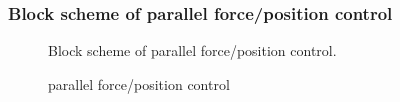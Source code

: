\documentclass{article}
\begin{document}
\subsubsection{Block scheme of parallel force/position control}
\begin{figure}[H]
    \centering
    \caption{Block scheme of parallel force/position control.}
    \label{fig:parallelForce}
\end{figure}


\begin{figure}[H]
    \centering
    \caption{parallel force/position control}
    \label{fig:parallelForce_graph}
\end{figure}
\end{document}
